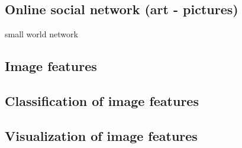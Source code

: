 \subsection{Online social network (art - pictures)}
small world network
\subsection{Image features}
\subsection{Classification of image features}
\subsection{Visualization of image features}